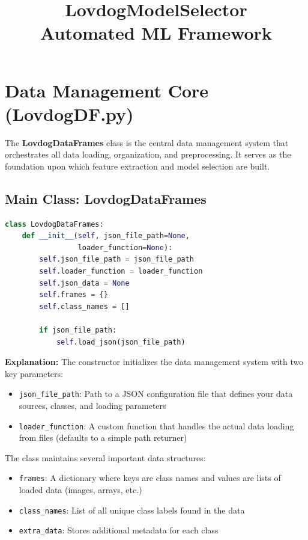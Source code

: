 \documentclass[10pt]{book}
\begin{document}
\title{\Huge\textbf{LovdogModelSelector}\\ \Large Automated ML Framework}
\author{}
\date{}
\maketitle

\tableofcontents

\chapter{Data Management Core (LovdogDF.py)}

The \textbf{LovdogDataFrames} class is the central data management system that orchestrates all data loading, organization, and preprocessing. It serves as the foundation upon which feature extraction and model selection are built.

\section{Main Class: LovdogDataFrames}

\begin{lstlisting}[language=Python]
class LovdogDataFrames:
    def __init__(self, json_file_path=None, 
                 loader_function=None):
        self.json_file_path = json_file_path
        self.loader_function = loader_function
        self.json_data = None
        self.frames = {}
        self.class_names = []
        
        if json_file_path:
            self.load_json(json_file_path)
\end{lstlisting}

\textbf{Explanation:}
The constructor initializes the data management system with two key parameters:
\begin{itemize}
\item \texttt{json\_file\_path}: Path to a JSON configuration file that defines your data sources, classes, and loading parameters
\item \texttt{loader\_function}: A custom function that handles the actual data loading from files (defaults to a simple path returner)
\end{itemize}

The class maintains several important data structures:
\begin{itemize}
\item \texttt{frames}: A dictionary where keys are class names and values are lists of loaded data (images, arrays, etc.)
\item \texttt{class\_names}: List of all unique class labels found in the data
\item \texttt{extra\_data}: Stores additional metadata for each class
\end{itemize}
\end{document}
